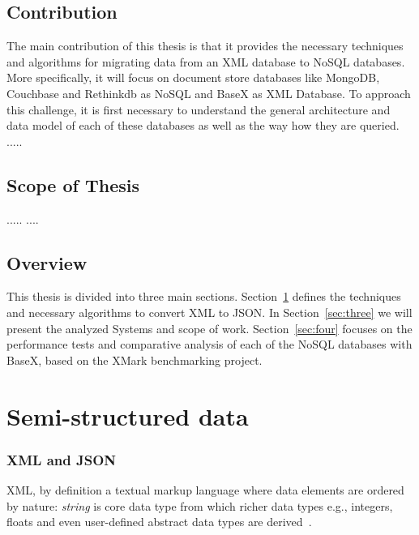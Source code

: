 \documentclass[a4paper,12pt]{article}
\begin{document}
	\subsection{Contribution}
		The main contribution of this thesis is that it provides the necessary techniques and algorithms for migrating data from an XML database to NoSQL databases.  More specifically, it will focus on document store databases like MongoDB, Couchbase and Rethinkdb as NoSQL and BaseX as XML Database. To approach this challenge, it is first necessary to understand the general architecture and data model of each of these databases as well as the way how they are queried.
		.....
		
	\subsection{Scope of Thesis}
	.....
	....
	\subsection{Overview}
		This thesis is divided into three main sections. Section~\ref{sec:two} defines the techniques and necessary algorithms to convert XML  to JSON. In Section~\ref{sec:three} we will present the analyzed Systems and scope of work. Section~\ref{sec:four} focuses on the performance tests and comparative analysis of each of the NoSQL databases with BaseX, based on the XMark benchmarking project.
		
		
	\newpage
	\section{Semi-structured data}
	\label{sec:two}

		\subsubsection{XML and JSON}
			XML, by definition a textual markup language where data elements are ordered by nature: \textit{string} is core data type from which richer data types e.g., integers, floats and even user-defined abstract data types are derived~\cite{xmark/original}.
			
\end{document}
